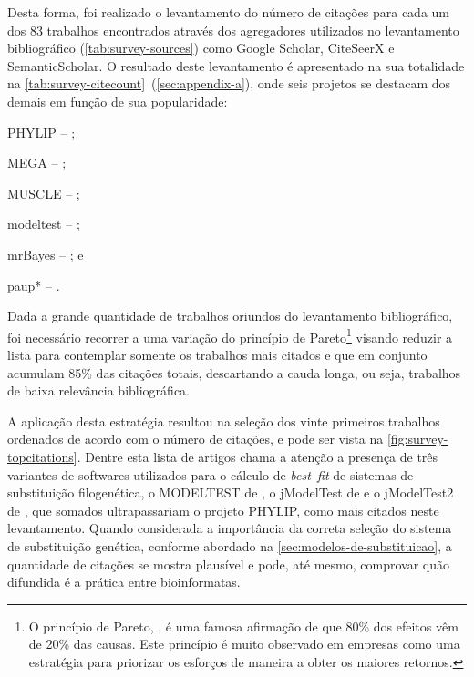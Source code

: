 \documentclass[english,brazilian]{UNISINOSmonografia} %
\begin{document}
Desta forma, foi realizado o levantamento do número de citações para cada um dos 83 trabalhos encontrados através dos agregadores utilizados no levantamento bibliográfico (\autoref{tab:survey-sources}) como Google Scholar, CiteSeerX e SemanticScholar.
O resultado deste levantamento é apresentado na sua totalidade na \autoref{tab:survey-citecount}~(\autoref{sec:appendix-a}),
onde seis projetos se destacam dos demais em função de sua popularidade:
\begin{inparaenum} 
	\item PHYLIP 	-- ;
	\item MEGA 		-- ;
	\item MUSCLE 	-- ;
	\item modeltest -- ;
	\item mrBayes 	-- ; e
	\item paup* 	-- .
\end{inparaenum}
Dada a grande quantidade de trabalhos oriundos do levantamento bibliográfico, foi necessário recorrer a uma variação do princípio de Pareto\footnote{
	O princípio de Pareto, \cite{ParetoPrinciple}, é uma famosa afirmação de que 80\% dos efeitos vêm de 20\% das causas. Este princípio é muito observado em empresas como uma estratégia para priorizar os esforços de maneira a obter os maiores retornos.
} visando reduzir a lista para contemplar somente os trabalhos mais citados e que em conjunto acumulam 85\% das citações totais, descartando a cauda longa, ou seja, trabalhos de baixa relevância bibliográfica.


A aplicação desta estratégia resultou na seleção dos vinte primeiros trabalhos ordenados de acordo com o número de citações, e pode ser vista na \autoref{fig:survey-topcitations}.
Dentre esta lista de artigos chama a atenção a presença de três variantes de softwares utilizados para o cálculo de \textit{best--fit} de sistemas de substituição filogenética, o MODELTEST de , o jModelTest de  e o jModelTest2 de , que somados ultrapassariam o projeto PHYLIP, como mais citados neste levantamento.
Quando considerada a importância da correta seleção do sistema de substituição genética, conforme abordado na \autoref{sec:modelos-de-substituicao}, a quantidade de citações se mostra plausível e pode, até mesmo, comprovar quão difundida é a prática entre bioinformatas.
\end{document}
